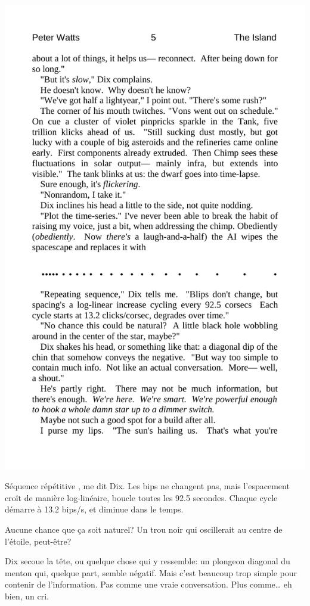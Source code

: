 \noindent\includegraphics[width=\textwidth]{../dots}

\og Séquence répétitive \fg , me dit Dix. \og Les bips ne changent pas, mais l'es\-pa\-ce\-ment croît de manière log-linéaire, boucle toutes les 92.5 secondes. Chaque cycle démarre à 13.2 bips/s, et diminue dans le temps.\fg

\og Aucune chance que ça soit naturel? Un trou noir qui oscillerait au centre de l'étoile, peut-être?\fg

Dix secoue la tête, ou quelque chose qui y ressemble: un plongeon diagonal du menton qui, quelque part, semble négatif. \og Mais c’est beaucoup trop simple pour contenir de l'information. Pas comme une vraie conversation. Plus comme\ldots{} eh bien, un cri. \fg


